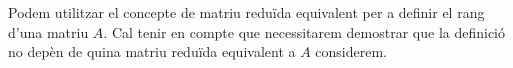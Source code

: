 Podem utilitzar el concepte de matriu reduïda equivalent per a definir el rang d'una matriu $A$. Cal tenir en compte que necessitarem demostrar que la definició no depèn de quina matriu reduïda equivalent a $A$ considerem.



